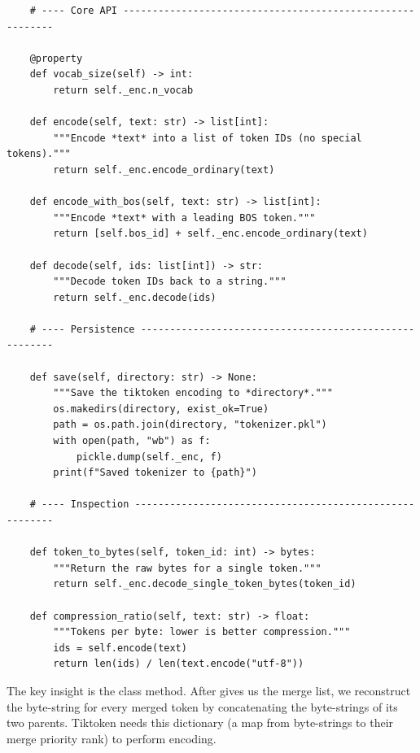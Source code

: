 \begin{lstlisting}
    # ---- Core API ----------------------------------------------------------

    @property
    def vocab_size(self) -> int:
        return self._enc.n_vocab

    def encode(self, text: str) -> list[int]:
        """Encode *text* into a list of token IDs (no special tokens)."""
        return self._enc.encode_ordinary(text)

    def encode_with_bos(self, text: str) -> list[int]:
        """Encode *text* with a leading BOS token."""
        return [self.bos_id] + self._enc.encode_ordinary(text)

    def decode(self, ids: list[int]) -> str:
        """Decode token IDs back to a string."""
        return self._enc.decode(ids)

    # ---- Persistence -------------------------------------------------------

    def save(self, directory: str) -> None:
        """Save the tiktoken encoding to *directory*."""
        os.makedirs(directory, exist_ok=True)
        path = os.path.join(directory, "tokenizer.pkl")
        with open(path, "wb") as f:
            pickle.dump(self._enc, f)
        print(f"Saved tokenizer to {path}")

    # ---- Inspection --------------------------------------------------------

    def token_to_bytes(self, token_id: int) -> bytes:
        """Return the raw bytes for a single token."""
        return self._enc.decode_single_token_bytes(token_id)

    def compression_ratio(self, text: str) -> float:
        """Tokens per byte: lower is better compression."""
        ids = self.encode(text)
        return len(ids) / len(text.encode("utf-8"))
\end{lstlisting}

The key insight is the  class method.  After  gives us the merge list, we reconstruct the byte-string for every merged token by concatenating the byte-strings of its two parents.  Tiktoken needs this  dictionary (a map from byte-strings to their merge priority rank) to perform encoding.



